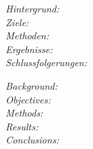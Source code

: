 \begin{abstractDE}
\textit{Hintergrund:} \\

\textit{Ziele:} \\

\textit{Methoden:} \\

\textit{Ergebnisse:} \\

\textit{Schlussfolgerungen:} \\

\end{abstractDE}

\vfill

\begin{abstractEN}

\textit{Background:} \\

\textit{Objectives:} \\

\textit{Methods:} \\

\textit{Results:} \\

\textit{Conclusions:} \\
\end{abstractEN}

\vfill
